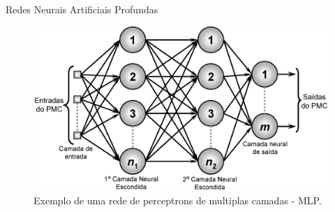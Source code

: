\documentclass{beamer}
\begin{document}
\begin{frame}{Redes Neurais Artificiais Profundas}

    \begin{figure}[!ht]
        \centering
        \includegraphics[width=0.6\columnwidth]{
            Imagens/RedeNeural.PNG
        }
        \caption{Exemplo de uma rede de perceptrons de multiplas camadas - MLP.}
        \label{fig:ann}
    \end{figure}

\end{frame}
\end{document}
